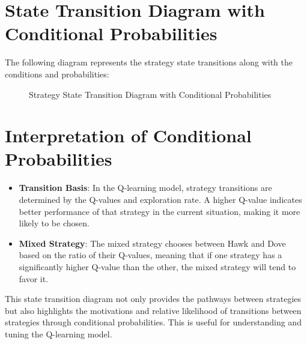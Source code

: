 \documentclass{article}
\begin{document}
\section*{State Transition Diagram with Conditional Probabilities}

The following diagram represents the strategy state transitions along with the conditions and probabilities:

\begin{figure}[h!]
    \centering
    \caption{Strategy State Transition Diagram with Conditional Probabilities}
    \label{fig:transitions}
\end{figure}

\section*{Interpretation of Conditional Probabilities}

\begin{itemize}
    \item \textbf{Transition Basis}: In the Q-learning model, strategy transitions are determined by the Q-values and exploration rate. A higher Q-value indicates better performance of that strategy in the current situation, making it more likely to be chosen.
    \item \textbf{Mixed Strategy}: The mixed strategy chooses between Hawk and Dove based on the ratio of their Q-values, meaning that if one strategy has a significantly higher Q-value than the other, the mixed strategy will tend to favor it.
\end{itemize}

This state transition diagram not only provides the pathways between strategies but also highlights the motivations and relative likelihood of transitions between strategies through conditional probabilities. This is useful for understanding and tuning the Q-learning model.
\end{document}
